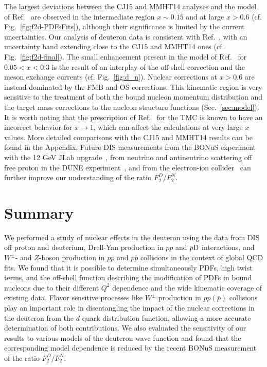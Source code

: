 \documentclass[%
      aps,
      prd,
      floatfix,
      preprintnumbers,
      preprint,
      showpacs,
      nofootinbib,
      tightenlines,
      amssymb,
      amsmath
]{revtex4-1}
\begin{document}
The largest deviations between the CJ15 and MMHT14 analyses and the model of Ref.~\cite{KP04} are 
observed in the intermediate region $x\sim 0.15$ and at large $x>0.6$ (cf. Fig.~\ref{fig:f2d-PDFsFits}), 
although their significance is limited by the current uncertainties.  
Our analysis of deuteron data is consistent with Ref.~\cite{KP04}, with an uncertainty band extending 
close to the CJ15 and MMHT14 ones (cf. Fig.~\ref{fig:f2d-final}). 
The small enhancement present in the model of Ref.~\cite{KP04} for $0.05<x<0.3$ is the result of 
an interplay of the off-shell correction and the meson exchange currents (cf. Fig.~\ref{fig:d_n}).  
Nuclear corrections at $x>0.6$ are instead dominated by the FMB and OS corrections.  
This kinematic region is very sensitive to the treatment of both the bound nucleon momentum distribution and 
the target mass corrections to the nucleon structure functions (Sec.~\ref{sec:model}).
It is worth noting that the prescription of Ref.~\cite{Georgi:1976ve} for the TMC is known to have an incorrect 
behavior for $x\to 1$, which can affect the calculations at very large $x$ values. 
More detailed comparisons with the CJ15 and MMHT14 results can be found in the Appendix. 
Future DIS measurements from the BONuS experiment with the 12 GeV JLab upgrade~\cite{BONuS12}, 
from neutrino and antineutrino scattering off free proton in the DUNE experiment~\cite{Acciarri:2015uup}, 
and from the electron-ion collider~\cite{Accardi:2012qut} can further 
improve our understanding of the ratio $F_2^D/F_2^N$.    



\section{Summary} 
\label{sec:sum}

We performed a study of nuclear effects in the deuteron 
using the data from DIS off proton and deuterium, Drell-Yan production in 
$pp$ and $p{\rm D}$ interactions, and $W^\pm$- and $Z$-boson production in $pp$ and $p\bar{p}$ 
collisions in the context of global QCD fits. We found that it is possible to 
determine simultaneously PDFs, high twist terms, and the off-shell function describing the modification of 
PDFs in bound nucleons due to their different $Q^2$ dependence and the wide kinematic coverage 
of existing data. Flavor sensitive processes like $W^\pm$ production in $pp(\bar{p})$ collisions 
play an important role in disentangling the impact of the nuclear corrections in the deuteron 
from the $d$ quark distribution function, allowing a more accurate determination of both contributions. 
We also evaluated the sensitivity of our results to various models of the deuteron  
wave function and found that the corresponding model dependence is reduced by the 
recent BONuS measurement of the ratio $F_2^D/F_2^N$. 
\end{document}
